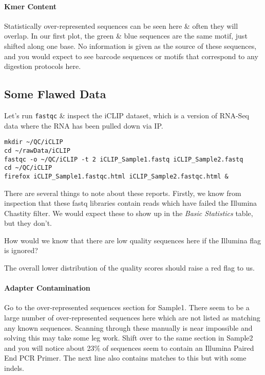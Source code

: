\paragraph{Kmer Content}
Statistically over-represented sequences can be seen here \& often they will overlap. 
In our first plot, the green \& blue sequences are the same motif, just shifted along one base.
No information is given as the source of these sequences, and you would expect to see barcode sequences or motifs that correspond to any digestion protocols here.

\subsection{Some Flawed Data}
Let's run \texttt{fastqc} \& inspect the iCLIP dataset, which is a version of RNA-Seq data where the RNA has been pulled down via IP.

\begin{lstlisting}
mkdir ~/QC/iCLIP
cd ~/rawData/iCLIP
fastqc -o ~/QC/iCLIP -t 2 iCLIP_Sample1.fastq iCLIP_Sample2.fastq
cd ~/QC/iCLIP
firefox iCLIP_Sample1.fastqc.html iCLIP_Sample2.fastqc.html &
\end{lstlisting}

There are several things to note about these reports.
Firstly, we know from inspection that these fastq libraries contain reads which have failed the Illumina Chastity filter.
We would expect these to show up in the \textit{Basic Statistics} table, but they don't.

\begin{questions}
How would we know that there are low quality sequences here if the Illumina flag is ignored?\\
\begin{answer}
The overall lower distribution of the quality scores should raise a red flag to us. \\
\end{answer}
\end{questions}

\paragraph{Adapter Contamination}
Go to the over-represented sequences section for Sample1.
There seem to be a large number of over-represented sequences here which are not listed as matching any known sequences.
Scanning through these manually is near impossible and solving this may take some leg work.
Shift over to the same section in Sample2 and you will notice about 23\% of sequences seem to contain an Illumina Paired End PCR Primer.
The next line also contains matches to this but with some indels. \\

